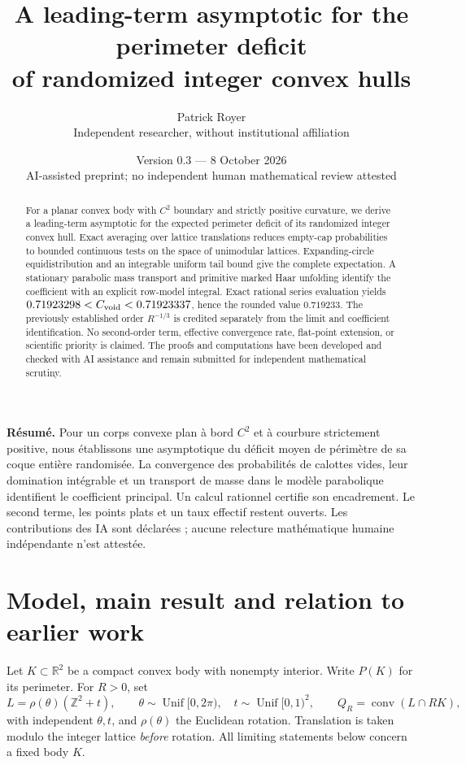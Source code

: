 \documentclass[11pt,a4paper]{article}
\title{\color{navy}A leading-term asymptotic for the perimeter deficit\\of randomized integer convex hulls}
\author{Patrick Royer\\\small Independent researcher, without institutional affiliation}
\date{Version 0.3 --- 8 October 2026\\\small AI-assisted preprint; no independent human mathematical review attested}
\newcommand{\R}{\mathbb R}\newcommand{\Z}{\mathbb Z}
\theoremstyle{remark}\newtheorem{remark}{Remark}
\numberwithin{equation}{section}
\begin{document}
\maketitle
\begin{abstract}
For a planar convex body with $C^2$ boundary and strictly positive curvature, we derive a leading-term asymptotic for the expected perimeter deficit of its randomized integer convex hull. Exact averaging over lattice translations reduces empty-cap probabilities to bounded continuous tests on the space of unimodular lattices. Expanding-circle equidistribution and an integrable uniform tail bound give the complete expectation. A stationary parabolic mass transport and primitive marked Haar unfolding identify the coefficient with an explicit row-model integral. Exact rational series evaluation yields $0.71923298<C_{\mathrm{void}}<0.71923337$, hence the rounded value $0.719233$. The previously established order $R^{-1/3}$ is credited separately from the limit and coefficient identification. No second-order term, effective convergence rate, flat-point extension, or scientific priority is claimed. The proofs and computations have been developed and checked with AI assistance and remain submitted for independent mathematical scrutiny.
\end{abstract}
\textbf{Résumé.} Pour un corps convexe plan à bord $C^2$ et à courbure strictement positive, nous établissons une asymptotique du déficit moyen de périmètre de sa coque entière randomisée. La convergence des probabilités de calottes vides, leur domination intégrable et un transport de masse dans le modèle parabolique identifient le coefficient principal. Un calcul rationnel certifie son encadrement. Le second terme, les points plats et un taux effectif restent ouverts. Les contributions des IA sont déclarées ; aucune relecture mathématique humaine indépendante n'est attestée.

\section{Model, main result and relation to earlier work}
Let $K\subset\R^2$ be a compact convex body with nonempty interior. Write $P(K)$ for its perimeter. For $R>0$, set
\begin{equation}\label{eq:law}
 L=\rho(\theta)(\Z^2+t),\qquad
 \theta\sim\operatorname{Unif}[0,2\pi),\quad
 t\sim\operatorname{Unif}[0,1)^2,
 \qquad Q_R=\operatorname{conv}(L\cap RK),
\end{equation}
with independent $\theta,t$, and $\rho(\theta)$ the Euclidean rotation. Translation is taken modulo the integer lattice \emph{before} rotation. All limiting statements below concern a fixed body $K$.
\end{document}

